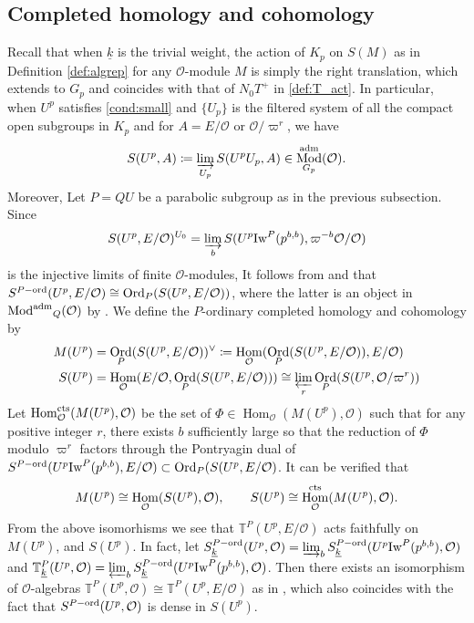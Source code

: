 \documentclass[leqno]{amsart}
\theoremstyle{definition}
\theoremstyle{remark}
\newcommand{\oo}{\mathcal{O}}
\DeclareMathOperator{\Hom}{Hom}
\newcommand{\cts}{\textnormal{cts}}
\DeclareMathOperator{\Mod}{\textnormal{Mod}}
\DeclareMathOperator{\aMod}{\textnormal{Mod}^{\textnormal{adm}}}
\DeclareMathOperator{\Ord}{Ord} %
\newcommand{\adm}{\textnormal{adm}}
\newcommand{\wt}[1]{\underline{ #1 }}
\newcommand{\Iw}{\textnormal{Iw}} %
\newcommand{\TT}{\mathbb{T}} %
\newcommand{\ord}{\textnormal{ord}} %
\begin{document}
\subsection{Completed homology and cohomology}

Recall that when $\wt{k}$ is the trivial weight,
the action of $K_p$
on  $S(M)$ as in Definition \ref{def:algrep} 
for any  $\oo$-module $M$
is simply the right translation,
which extends to $G_p$
and coincides with that of $N_0T^+$ in \eqref{def:T_act}.
In particular,
when $U^p$ satisfies \eqref{cond:small}
and $\{U_p\}$ is the filtered system of 
all the compact open subgroups in $K_p$
and for $A=E/\oo$ or  $\oo/\varpi^{r}$, we have
\begin{equation}\label{eq:complete}
	S(U^p,A)\coloneqq
	\varinjlim_{U_p}S(U^pU_p,A)\in 
	\Mod^{\adm}_{G_p}(\oo).
\end{equation}
Moreover, Let $P=QU$ be a parabolic subgroup 
as in the previous subsection.
Since 
\[
	S(U^p,E/\oo)^{U_0}=
	\varinjlim_{b}
	S(U^p\Iw^P(p^{b,b}),\varpi^{-b}\oo/\oo)
\]
is the injective limits of finite $\oo$-modules,
It follows from \cite[Lem 3.1.5]{emeI} and \cite[Prop 3.2.4]{emeI}
that $S^{P-\ord}(U^p,E/\oo)\cong \Ord_P(S(U^p,E/\oo))$,
where the latter is an object in $\aMod_Q(\oo)$
by \cite[Thm 3.3.3]{emeI}.
We define the $P$-ordinary completed homology and cohomology by
\begin{align}\label{eq:completed_coh}
	M(U^p)&=
	\Ord_P(S(U^p,E/\oo))^\vee
	\coloneqq \Hom_\oo(\Ord_P(S(U^p,E/\oo)),E/\oo)\\
	S(U^p)&=\Hom_\oo(E/\oo, \Ord_P(S(U^p,E/\oo)))
	\cong \varprojlim_r \Ord_P(S(U^p,\oo/\varpi^{r}))
\end{align}
Let $\Hom_\oo^{\cts}(M(U^p),\oo)$
be the set of
$\Phi\in \Hom_\oo(M(U^p),\oo)$ 
such that for any positive integer $r$,
there exists $b$ sufficiently large so that 
the reduction of $\Phi$ modulo $\varpi^r$
factors through
the Pontryagin dual of 
$S^{P-\ord}(U^p\Iw^P(p^{b,b}),E/\oo)\subset \Ord_P(S(U^p,E/\oo)$. 
It can be verified that 
\[
	M(U^p)\cong \Hom_\oo(S(U^p),\oo),\qquad
	S(U^p)\cong \Hom_\oo^{\cts}(M(U^p),\oo).
\]
From the above isomorhisms we see that
$\TT^P(U^p,E/\oo)$ acts faithfully
on  $M(U^p)$, and  $S(U^p)$.
In fact, 
let $S_{\wt{k}}^{P-\ord}(U^p,\oo)
=\varinjlim_{b}S_{\wt{k}}^{P-\ord}(U^p\Iw^P(p^{b,b}),\oo)$
and 
$\TT^P_{\wt{k}}(U^p,\oo)=\varprojlim_bS_{\wt{k}}^{P-\ord}(U^p\Iw^P(p^{b,b}),\oo)$.
Then there exists an isomorphism of $\oo$-algebras 
$\TT^P(U^p,\oo)\cong \TT^P(U^p,E/\oo)$
as in \cite[Lem 2.17]{ger},
which also coincides with the fact that
$S^{P-\ord}(U^p,\oo)$ is dense in $S(U^p)$.
\end{document}
